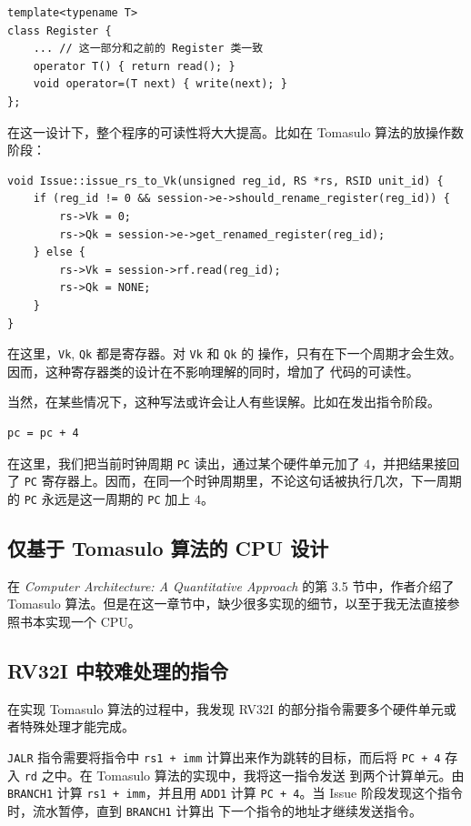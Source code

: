 \documentclass[12pt]{article}
\begin{document}
    \begin{verbatim}
template<typename T>
class Register {
    ... // 这一部分和之前的 Register 类一致
    operator T() { return read(); }
    void operator=(T next) { write(next); }
};
    \end{verbatim}

    在这一设计下，整个程序的可读性将大大提高。比如在 Tomasulo 算法的放操作数阶段：

    \begin{verbatim}
void Issue::issue_rs_to_Vk(unsigned reg_id, RS *rs, RSID unit_id) {
    if (reg_id != 0 && session->e->should_rename_register(reg_id)) {
        rs->Vk = 0;
        rs->Qk = session->e->get_renamed_register(reg_id);
    } else {
        rs->Vk = session->rf.read(reg_id);
        rs->Qk = NONE;
    }
}
    \end{verbatim}

    在这里，\texttt{Vk}, \texttt{Qk} 都是寄存器。对 \texttt{Vk} 和 \texttt{Qk} 的
    操作，只有在下一个周期才会生效。因而，这种寄存器类的设计在不影响理解的同时，增加了
    代码的可读性。

    当然，在某些情况下，这种写法或许会让人有些误解。比如在发出指令阶段。

    \begin{verbatim}
pc = pc + 4
    \end{verbatim}

    在这里，我们把当前时钟周期 \texttt{PC} 读出，通过某个硬件单元加了 $4$，并把结果接回了
    \texttt{PC} 寄存器上。因而，在同一个时钟周期里，不论这句话被执行几次，下一周期的 \texttt{PC}
    永远是这一周期的 \texttt{PC} 加上 $4$。

    \subsection{仅基于 Tomasulo 算法的 CPU 设计}

    在 \emph{Computer Architecture: A Quantitative Approach} 的第 3.5 节中，作者介绍了
    Tomasulo 算法。但是在这一章节中，缺少很多实现的细节，以至于我无法直接参照书本实现一个 CPU。

    \subsection{RV32I 中较难处理的指令}

    在实现 Tomasulo 算法的过程中，我发现 RV32I 的部分指令需要多个硬件单元或者特殊处理才能完成。

    \texttt{JALR} 指令需要将指令中 \texttt{rs1 + imm} 计算出来作为跳转的目标，而后将
    \texttt{PC + 4} 存入 \texttt{rd} 之中。在 Tomasulo 算法的实现中，我将这一指令发送
    到两个计算单元。由 \texttt{BRANCH1} 计算 \texttt{rs1 + imm}，并且用 \texttt{ADD1}
    计算 \texttt{PC + 4}。当 Issue 阶段发现这个指令时，流水暂停，直到 \texttt{BRANCH1} 计算出
    下一个指令的地址才继续发送指令。
\end{document}
